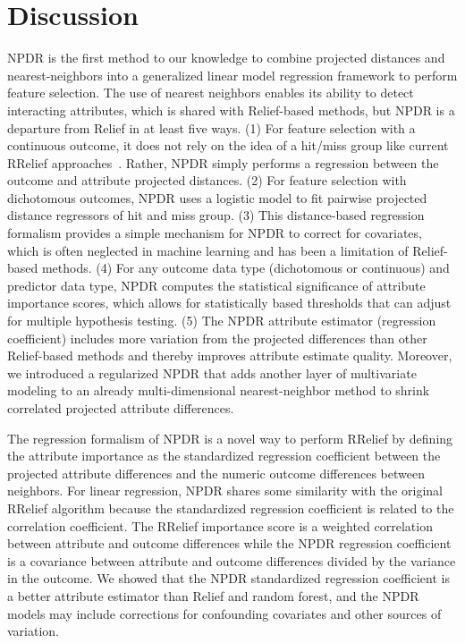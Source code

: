 \documentclass[10pt]{article}
\begin{document}
\section{Discussion}
NPDR is the first method to our knowledge to combine projected distances and nearest-neighbors into a generalized linear model regression framework to perform feature selection.
The use of nearest neighbors enables its ability to detect interacting attributes, which is shared with Relief-based methods, but NPDR is a departure from Relief in at least five ways.
(1) For feature selection with a continuous outcome, it does not rely on the idea of a hit/miss group like current RRelief approaches~\cite{urbanowicz17}.
Rather, NPDR simply performs a regression between the outcome and attribute projected distances.
(2) For feature selection with dichotomous outcomes, NPDR uses a logistic model to fit pairwise projected distance regressors of hit and miss group.
(3) This distance-based regression formalism provides a simple mechanism for NPDR to correct for covariates, which is often neglected in machine learning and has been a limitation of Relief-based methods.
(4) For any outcome data type (dichotomous or continuous) and predictor data type, NPDR computes the statistical significance of attribute importance scores, which allows for statistically based thresholds that can adjust for multiple hypothesis testing.
(5) The NPDR attribute estimator (regression coefficient) includes more variation from the projected differences than other Relief-based methods and thereby improves attribute estimate quality.
Moreover, we introduced a regularized NPDR that adds another layer of multivariate modeling to an already multi-dimensional nearest-neighbor method to shrink correlated projected attribute differences.

The regression formalism of NPDR is a novel way to perform RRelief by defining the attribute importance as the standardized regression coefficient between the projected attribute differences and the numeric outcome differences between neighbors.
For linear regression, NPDR shares some similarity with the original RRelief algorithm because the standardized regression coefficient is related to the correlation coefficient.
The RRelief importance score is a weighted correlation between attribute and outcome differences while the NPDR regression coefficient is a covariance between attribute and outcome differences divided by the variance in the outcome.
We showed that the NPDR standardized regression coefficient is a better attribute estimator than Relief and random forest, and the NPDR models may include corrections for confounding covariates and other sources of variation.
\end{document}
